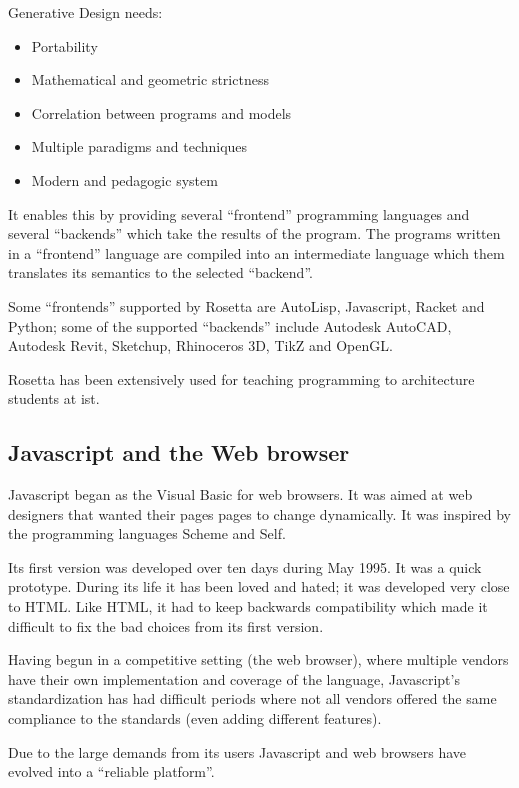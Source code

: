\documentclass{./llncs2e/llncs}
\begin{document}
	Generative Design needs:
	\begin{itemize}
		\item Portability
		\item Mathematical and geometric strictness
		\item Correlation between programs and models
		\item Multiple paradigms and techniques
		\item Modern and pedagogic system
	\end{itemize}

	It enables this by providing several ``frontend'' programming languages and several ``backends'' which take the results of the program. The programs written in a ``frontend'' language are compiled into an intermediate language which them translates its semantics to the selected ``backend''.

	Some ``frontends'' supported by Rosetta are AutoLisp, Javascript, Racket and Python; some of the supported ``backends'' include Autodesk AutoCAD, Autodesk Revit, Sketchup, Rhinoceros 3D, TikZ and OpenGL.

	Rosetta has been extensively used for teaching programming to architecture students at \ac{ist}. 


\subsection{Javascript and the Web browser}
	Javascript began as the Visual Basic for web browsers. It was aimed at web designers that wanted their pages pages to change dynamically. It was inspired by the programming languages Scheme and Self.

	Its first version was developed over ten days during May 1995. It was a quick prototype. 
	During its life it has been loved and hated; it was developed very close to HTML. Like HTML, it had to keep backwards compatibility which made it difficult to fix the bad choices from its first version.

	Having begun in a competitive setting (the web browser), where multiple vendors have their own implementation and coverage of the language, Javascript's standardization has had difficult periods where not all vendors offered the same compliance to the standards (even adding different features).

	Due to the large demands from its users Javascript and web browsers have evolved into a ``reliable platform''. 
\end{document}
